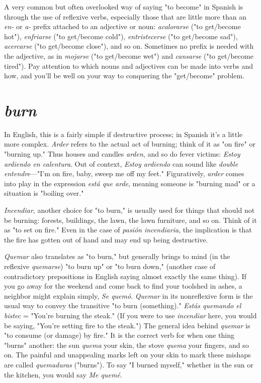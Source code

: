 A very common but often overlooked way of saying "to become" in Spanish is through the use of reflexive verbs, especially those
that are little more than an \emph{en-} or \emph{a-} prefix attached to an adjective or
noun: \emph{acalorarse} ("to get/become hot"), \emph{enfriarse} ("to get/become
cold"), \emph{entristecerse} ("to get/become sad"), \emph{acercarse} ("to get/become
close"), and so on. Sometimes no prefix is needed with the adjective,
as in \emph{mojarse} ("to get/become wet") and \emph{cansarse} ("to get/become
tired"). Pay attention to which nouns and adjectives can be made into
verbs and how, and you'll be well on your way to conquering the "get/become" problem.

\section{\emph{burn}}

In English, this is a fairly simple if destructive process; in
Spanish it's a little more complex. \emph{Arder} refers to the actual act of
burning; think of it as "on fire" or "burning up." Thus houses and
candles \emph{arden}, and so do fever victims: \emph{Estoy ardiendo en calentura}.
Out of context, \emph{Estoy ardiendo} can sound like \emph{double entendre}---"I'm
on fire, baby, sweep me off my feet." Figuratively, \emph{arder} comes into
play in the expression \emph{está que arde}, meaning someone is "burning
mad" or a situation is "boiling over."

\emph{Incendiar}, another choice for "to burn," is usually used for
things that should not be burning: forests, buildings, the lawn, the
lawn furniture, and so on. Think of it as "to set on fire." Even in the
case of \emph{pasión incendiaria}, the implication is that the fire has gotten
out of hand and may end up being destructive.

\emph{Quemar} also translates as "to burn," but generally brings to
mind (in the reflexive \emph{quemarse}) "to burn up" or "to burn down," (another case of contradictory prepositions in English saying almost exactly the same thing). If you go away for the weekend and come back
to find your toolshed in ashes, a neighbor might explain simply, \emph{Se
quemó}. \emph{Quemar} in its nonreflexive form is the usual way to convey the
transitive "to burn (something)." \emph{Estás quemando el bistec} = "You're
burning the steak." (If you were to use \emph{incendiar} here, you would be
saying, "You're setting fire to the steak.") The general idea behind \emph{quemar} is "to consume (or damage) by fire." It is the correct verb for when
one thing "burns" another: the sun \emph{quema} your skin, the stove \emph{quema}
your fingers, and so on. The painful and unappealing marks left on
your skin to mark these mishaps are called \emph{quemaduras} ("burns"). To
say "I burned myself," whether in the sun or the kitchen, you would
say \emph{Me quemé}.

